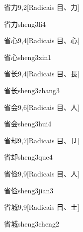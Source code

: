 \begin{entry}{省力}{9,2}[Radicais ⽬、⼒]
  \begin{phonetics}{省力}{sheng3li4}
  \end{phonetics}
\end{entry}

\begin{entry}{省心}{9,4}[Radicais ⽬、⼼]
  \begin{phonetics}{省心}{sheng3xin1}
  \end{phonetics}
\end{entry}

\begin{entry}{省长}{9,4}[Radicais ⽬、⾧]
  \begin{phonetics}{省长}{sheng3zhang3}
  \end{phonetics}
\end{entry}

\begin{entry}{省会}{9,6}[Radicais ⽬、⼈]
  \begin{phonetics}{省会}{sheng3hui4}
  \end{phonetics}
\end{entry}

\begin{entry}{省却}{9,7}[Radicais ⽬、⼙]
  \begin{phonetics}{省却}{sheng3que4}
  \end{phonetics}
\end{entry}

\begin{entry}{省俭}{9,9}[Radicais ⽬、⼈]
  \begin{phonetics}{省俭}{sheng3jian3}
  \end{phonetics}
\end{entry}

\begin{entry}{省城}{9,9}[Radicais ⽬、⼟]
  \begin{phonetics}{省城}{sheng3cheng2}
  \end{phonetics}
\end{entry}

